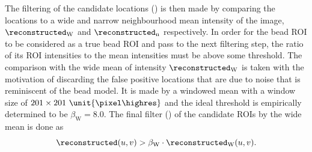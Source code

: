 The filtering of the candidate locations () is then made by comparing the locations to a wide
and narrow neighbourhood mean intensity of the image, \(\reconstructed_{\text{W}}\) and
    \(\reconstructed_{\text{n}}\) respectively.
In order for the bead \ac{ROI} to be considered as a true bead \ac{ROI} and pass to the next filtering step, the ratio
    of its \ac{ROI} intensities to the mean intensities must be above some threshold.
The comparison with the wide mean of intensity \(\reconstructed_{\text{W}}\) is taken with the motivation of 
    discarding the false positive locations that are due to noise that is reminiscent of the bead model.
It is made by a windowed mean with a window size of \(201 \times 201~\unit{\pixel\highres}\) and the ideal threshold is empirically determined 
    to be \(\beta_\text{W} = 8.0\). 
The final filter () of the candidate \acp{ROI} by the wide mean is done as
\begin{equation*}
  \reconstructed(u,v) > \beta_\text{W} \cdot \reconstructed_{\text{W}}(u,v).
\end{equation*}

\begin{marginfigure}[*-15]
    \caption{%
        The wide mean filter of the candidate bead \acp{ROI}.
        It is effective in discarding the false positive locations that are due to the background noise and therefore
            have a low intensity in comparison with the mean of their neighbourhood intensities.
    }
\end{marginfigure}

